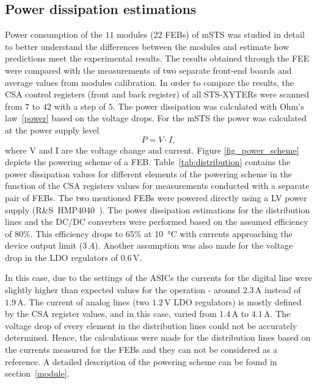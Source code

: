 \subsection{Power dissipation estimations}
 Power consumption of the $11$ modules ($22$ \glspl{FEB}) of \gls{mSTS} was studied in detail to better understand the differences between the modules and estimate how predictions meet the experimental results. The results obtained through the \gls{FEE} were compared with the measurements of two separate front-end boards and average values from modules calibration. In order to compare the results, the \gls{CSA} control registers (front and back register) of all STS-XYTERs were scanned from $7$ to $42$ with a step of $5$. The power dissipation was calculated with Ohm's law~\ref{power} based on the voltage drops. For the \gls{mSTS} the power was calculated at the power supply level
  \begin{equation}
  \label{power}
    P = V\cdot I,
\end{equation}
where V and I are the voltage change and current. Figure \ref{fig_power_scheme} depicts the powering scheme of a \gls{FEB}. Table~\ref{tab:distribution} contains the power dissipation values for different elements of the powering scheme in the function of the \gls{CSA} registers values for measurements conducted with a separate pair of \glspl{FEB}. The two mentioned \glspl{FEB} were powered directly using a \gls{LV} power supply (R\&S~HMP4040~\cite{RS}). The power dissipation estimations for the distribution lines and the DC/DC converters were performed based on the assumed efficiency of $80$\%. This efficiency drops to $65$\% at \SI{10}{\celsius} with currents approaching the device output limit ($3\,A$).  Another assumption was also made for the voltage drop in the \gls{LDO} regulators of $0.6$\,V. 
 
 In this case, due to the settings of the \glspl{ASIC} the currents for the digital line were slightly higher than expected values for the operation - around $2.3$\,A instead of $1.9$\,A. The current of analog lines (two $1.2$\,V LDO regulators) is mostly defined by the \gls{CSA} register values, and in this case, varied from $1.4$\,A to $4.1$\,A.  The voltage drop of every element in the distribution lines could not be accurately determined. Hence, the calculations were made for the distribution lines based on the currents measured for the \glspl{FEB} and they can not be considered as a reference. A detailed description of the powering scheme can be found in section~\ref{module}.


